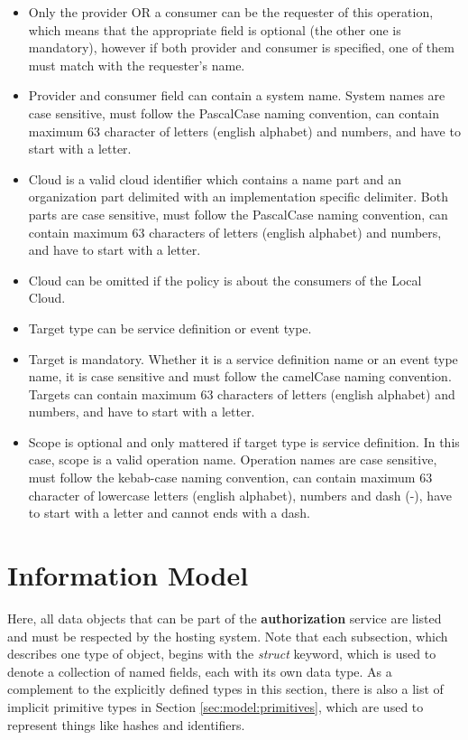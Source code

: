 \documentclass[a4paper]{arrowhead}
\begin{document}
\begin{itemize}
    \item Only the provider OR a consumer can be the requester of this operation, which means that the appropriate field is optional (the other one is mandatory), however if both provider and consumer is specified, one of them must match with the requester's name.
    \item Provider and consumer field can contain a system name. System names are case sensitive, must follow the PascalCase naming convention, can contain maximum 63 character of letters (english alphabet) and numbers, and have to start with a letter.
    \item Cloud is a valid cloud identifier which contains a name part and an organization part delimited with an implementation specific delimiter. Both parts are case sensitive, must follow the PascalCase naming convention, can contain maximum 63 characters of letters (english alphabet) and numbers, and have to start with a letter.
    \item Cloud can be omitted if the policy is about the consumers of the Local Cloud. 
    \item Target type can be service definition or event type. 
    \item Target is mandatory. Whether it is a service definition name or an event type name, it is case sensitive and must follow the camelCase naming convention. Targets can contain maximum 63 characters of letters (english alphabet) and numbers, and have to start with a letter.
    \item Scope is optional and only mattered if target type is service definition. In this case, 
    scope is a valid operation name. Operation names are case sensitive, must follow the kebab-case naming convention, can contain maximum 63 character of lowercase letters (english alphabet), numbers and dash (-), have to start with a letter and cannot ends with a dash.
\end{itemize}

\clearpage

\section{Information Model}
\label{sec:model}

Here, all data objects that can be part of the \textbf{authorization} service are listed and must be respected by the hosting system.
Note that each subsection, which describes one type of object, begins with the \textit{struct} keyword, which is used to denote a collection of named fields, each with its own data type.
As a complement to the explicitly defined types in this section, there is also a list of implicit primitive types in Section \ref{sec:model:primitives}, which are used to represent things like hashes and identifiers.
\end{document}
